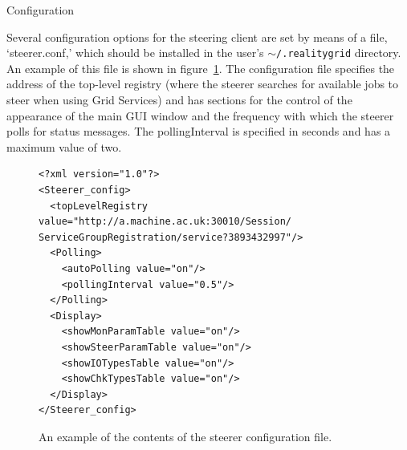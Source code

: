 \documentclass[a4paper,twoside]{article}
\begin{document}
\begin{section}{Configuration}
\label{sec:config}

Several configuration options for the steering client are set by means
of a file, `steerer.conf,' which should be installed in
the user's \texttt{$\sim$/.realitygrid} directory. An example of this
file is shown in figure~\ref{fig:steerer_conf}.  The configuration
file specifies the address of the top-level registry (where the
steerer searches for available jobs to steer when using Grid Services)
and has sections for the control of the appearance of the main GUI
window and the frequency with which the steerer polls for status
messages.  The pollingInterval is specified in seconds and has a
maximum value of two.

\begin{figure}
\begin{verbatim}
<?xml version="1.0"?>
<Steerer_config>
  <topLevelRegistry value="http://a.machine.ac.uk:30010/Session/
ServiceGroupRegistration/service?3893432997"/>
  <Polling>
    <autoPolling value="on"/>
    <pollingInterval value="0.5"/>
  </Polling>
  <Display>
    <showMonParamTable value="on"/>
    <showSteerParamTable value="on"/>
    <showIOTypesTable value="on"/>
    <showChkTypesTable value="on"/>
  </Display>
</Steerer_config>
\end{verbatim}
\caption{An example of the contents of the steerer configuration file.}
\label{fig:steerer_conf}
\end{figure}

\end{section}

\end{document}
